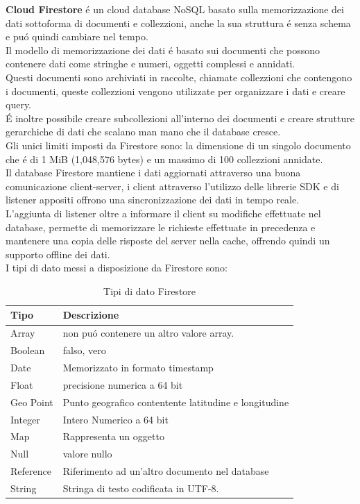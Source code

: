 \textbf{Cloud Firestore} \'e un cloud database NoSQL basato sulla memorizzazione dei dati sottoforma di documenti e collezzioni, anche la sua struttura \'e senza schema e pu\'o quindi cambiare nel tempo.\\
Il modello di memorizzazione dei dati \'e basato sui documenti che possono contenere dati come stringhe e numeri, oggetti complessi e annidati.\\
Questi documenti sono archiviati in raccolte, chiamate collezzioni che contengono i documenti, queste collezzioni vengono utilizzate per organizzare i dati e creare query.\\
\'E inoltre possibile creare subcollezioni all'interno dei documenti e creare strutture gerarchiche di dati che scalano man mano che il database cresce.\\
Gli unici limiti imposti da Firestore sono: la dimensione di un singolo documento che \'e di 1 MiB (1,048,576 bytes) e un massimo di 100 collezzioni annidate.\\
Il database Firestore mantiene i dati aggiornati attraverso una buona comunicazione client-server, i client attraverso l'utilizzo delle librerie SDK e di listener appositi offrono una sincronizzazione dei dati in tempo reale.\\
L'aggiunta di listener oltre a informare il client su modifiche effettuate nel database, permette di memorizzare le richieste effettuate in precedenza e mantenere una copia delle risposte del server nella cache, offrendo quindi un supporto offline dei dati.\\

I tipi di dato messi a disposizione da Firestore sono:

\begin{table}[h]
\begin{center}
\begin{tabular}{|p{3cm}|p{10cm}|}
    \hline
\textbf{Tipo} & \textbf{Descrizione} \\ \hline
Array & non pu\'o contenere un altro valore array. \\ \hline
Boolean & falso, vero  \\ \hline
Date & Memorizzato in formato timestamp \\ \hline
Float & precisione numerica a 64 bit \\ \hline
Geo Point & Punto geografico contentente latitudine e longitudine \\ \hline
Integer & Intero Numerico a 64 bit \\ \hline
Map & Rappresenta un oggetto  \\ \hline
Null & valore nullo \\ \hline
Reference & Riferimento ad un'altro documento nel database  \\ \hline
String & Stringa di testo codificata in UTF-8.\\
\hline
\end{tabular}
\caption[Dati Firestore]{Tipi di dato Firestore}\label{tab:Firestore Tipi di dato}
\end{center}
\end{table}

